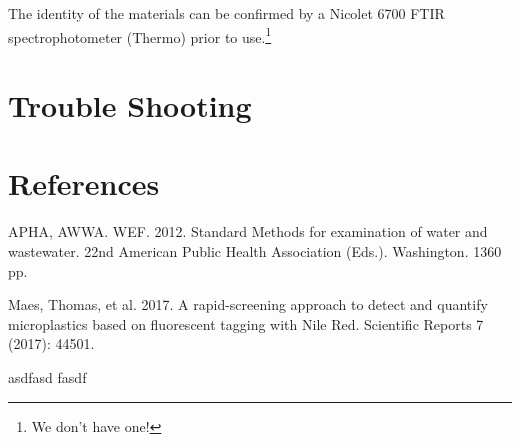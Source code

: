 \documentclass[12pt]{../SOP4_alpha}\usepackage[]{graphicx}\usepackage[]{color}
\begin{document}
\NP The identity of the materials can be confirmed by a Nicolet 6700 FTIR
spectrophotometer (Thermo) prior to use.\footnote{We don't have one!} 


\section{Trouble Shooting}

\section{References}

\NP APHA, AWWA. WEF. 2012. Standard Methods for examination of water and wastewater. 22nd American Public Health Association (Eds.). Washington. 1360 pp.

\NP Maes, Thomas, et al. 2017. A rapid-screening approach to detect and quantify microplastics based on fluorescent tagging with Nile Red. Scientific Reports 7 (2017): 44501.

\cite{wittenberg2001invasive} asdfasd fasdf



\end{document}
